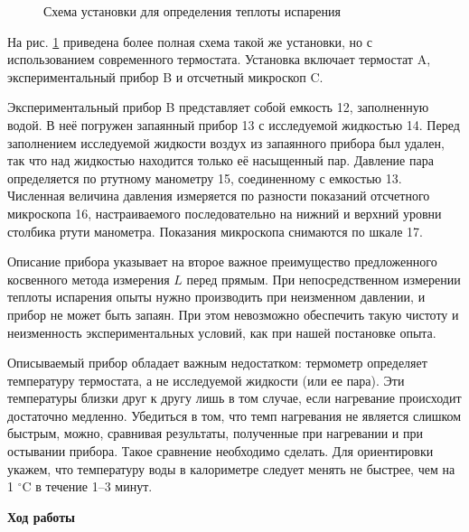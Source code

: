 \documentclass[a4paper, 12pt]{article}
\begin{document}
\begin{figure}[ht]
\begin{center}
\begin{minipage}[ht]{0.65\linewidth}
                \caption{Схема установки для определения теплоты испарения}
                \label{pic2}
            \end{minipage}
        \end{center}
    \end{figure}
    
    На рис. \ref{pic2} приведена более полная схема такой же установки, но с использованием современного термостата. Установка включает термостат A, экспериментальный прибор B и отсчетный микроскоп C.
    
    Экспериментальный прибор B представляет собой емкость 12, заполненную водой. В неё погружен запаянный прибор 13 с исследуемой жидкостью 14. Перед заполнением исследуемой жидкости воздух из запаянного прибора был удален, так что над жидкостью находится только её насыщенный пар. Давление пара определяется по ртутному манометру 15, соединенному с емкостью 13. Численная величина давления измеряется по разности показаний отсчетного микроскопа 16, настраиваемого последовательно на нижний и верхний уровни столбика ртути манометра. Показания микроскопа снимаются по шкале 17.
    
    Описание прибора указывает на второе важное преимущество предложенного косвенного метода измерения $L$ перед прямым. При непосредственном измерении теплоты испарения опыты нужно производить при неизменном давлении, и прибор не может быть запаян. При этом невозможно обеспечить такую чистоту и неизменность экспериментальных условий, как при нашей постановке опыта.
    
    Описываемый прибор обладает важным недостатком: термометр определяет температуру термостата, а не исследуемой жидкости (или ее пара). Эти температуры близки друг к другу лишь в том случае, если нагревание происходит достаточно медленно. Убедиться в том, что темп нагревания не является слишком быстрым, можно, сравнивая результаты, полученные при нагревании и при остывании прибора. Такое сравнение необходимо сделать. Для ориентировки укажем, что температуру воды в калориметре следует менять не быстрее, чем на 1 $^\circ\text{C}$ в течение 1–3 минут.
    
    \begin{flushleft}
        {\Large {\bf Ход работы}}
    \end{flushleft}
    
\end{document}
